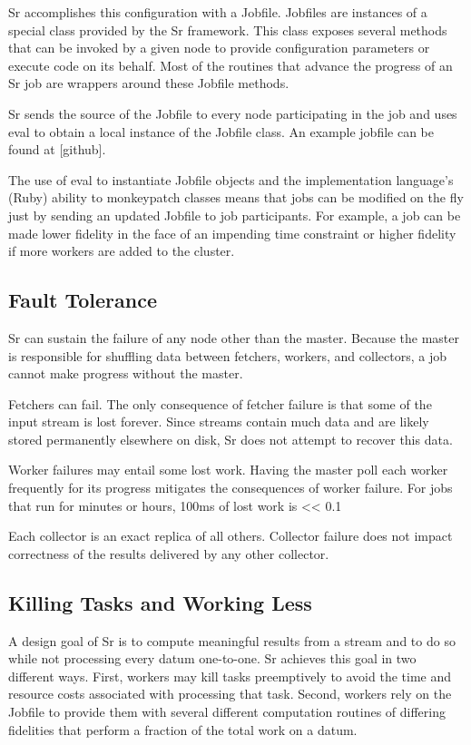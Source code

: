 \documentclass[12pt]{article}
\begin{document}
Sr accomplishes this configuration with a Jobfile. Jobfiles are instances of a special class provided by the Sr framework. This class exposes several methods that can be invoked by a given node to provide configuration parameters or execute code on its behalf. Most of the routines that advance the progress of an Sr job are wrappers around these Jobfile methods.

Sr sends the source of the Jobfile to every node participating in the job and uses eval to obtain a local instance of the Jobfile class. An example jobfile can be found at [github].

The use of eval to instantiate Jobfile objects and the implementation language’s (Ruby) ability to monkeypatch classes means that jobs can be modified on the fly just by sending an updated Jobfile to job participants. For example, a job can be made lower fidelity in the face of an impending time constraint or higher fidelity if more workers are added to the cluster.
\subsection{Fault Tolerance}
Sr can sustain the failure of any node other than the master. Because the master is responsible for shuffling data between fetchers, workers, and collectors, a job cannot make progress without the master.

Fetchers can fail. The only consequence of fetcher failure is that some of the input stream is lost forever. Since streams contain much data and are likely stored permanently elsewhere on disk, Sr does not attempt to recover this data.

Worker failures may entail some lost work. Having the master poll each worker frequently for its progress mitigates the consequences of worker failure. For jobs that run for minutes or hours, 100ms of lost work is << 0.1%

Each collector is an exact replica of all others. Collector failure does not impact correctness of the results delivered by any other collector.
\subsection{Killing Tasks and Working Less}
A design goal of Sr is to compute meaningful results from a stream and to do so while not processing every datum one-to-one. Sr achieves this goal in two different ways. First, workers may kill tasks preemptively to avoid the time and resource costs associated with processing that task. Second, workers rely on the Jobfile to provide them with several different computation routines of differing fidelities that perform a fraction of the total work on a datum.
\end{document}
